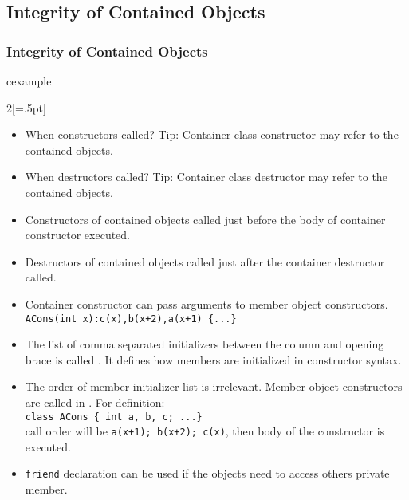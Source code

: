 \subsection{Integrity of Contained Objects}
\begin{frame}
\frametitle{Integrity of Contained Objects}
\begin{beamercolorbox}{cexample} \begin{multicols}{2}[\columnseprule=.5pt]
\codeCompCons \end{multicols}
\end{beamercolorbox}
\begin{itemize}
\item When constructors called? Tip: Container class constructor may refer to the contained
objects.
\item When destructors called? Tip: Container class destructor may refer to the contained
objects.
\end{itemize}
\end{frame}

\begin{frame}[fragile]
\begin{itemize}
\item Constructors of contained objects called just before the body of container constructor
executed.
\item Destructors of contained objects called just after the container destructor called.
\item Container constructor can pass arguments to member object constructors.\\
	\lstinline!ACons(int x):c(x),b(x+2),a(x+1) {...}!
\item The list of comma separated initializers between the column and opening brace is called . It defines how members are initialized in constructor syntax.
\item The order of member initializer list is irrelevant.
Member object constructors are called in . For definition:\\
\lstinline!class ACons { int a, b, c; ...}!\\

\noindent
call order will be \lstinline!a(x+1); b(x+2); c(x)!, then body of the constructor
is executed.

\item \lstinline!friend! declaration can be used if the objects need to access others private
member.
\end{itemize}
\end{frame}

